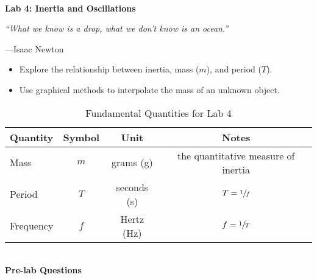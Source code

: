 

\addpoints




\begin{centering}
\noindent\textbf{\\\Large Lab 4: Inertia and Oscillations\\} 
\end{centering}

\epigraph{\itshape``What we know is a drop, what we don't know is an ocean.''}{---Isaac Newton}
\qsp


\begin{itemize}
\item Explore the relationship between inertia, mass ($m$), and period ($T$). 
\item Use graphical methods to interpolate the mass of an unknown object. 
\end{itemize}


\begin{table}[h!]
\centering
\captionsetup{font=small, labelfont=bf}
\caption{Fundamental Quantities for Lab 4}
\label{tab:kinematics}
\begin{tabular}{@{} l c c c @{}}
\toprule
\textbf{Quantity} & \textbf{Symbol}  & \textbf{Unit}& \textbf{Notes}  \\
\midrule
Mass    & $m$ & grams (g) & the quantitative measure of inertia \\
Period & $T$ & seconds (s) &  $T = \sfrac{1}{f}$\\
Frequency & $f$  & Hertz (Hz) & $f=\sfrac{1}{T}$\\
\bottomrule
\end{tabular}
\end{table}

\textbf{\\\Large Pre-lab Questions\\}

